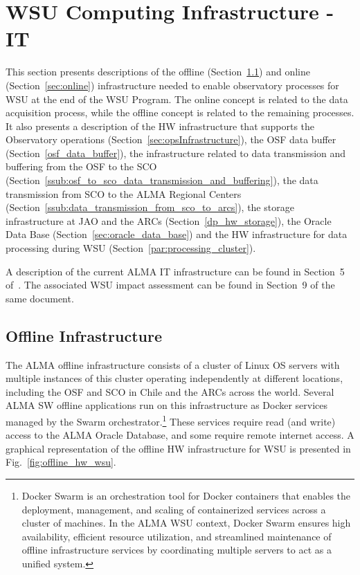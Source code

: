\section{WSU Computing Infrastructure - IT}
\label{sec:wsu_compu_it}

This section presents descriptions of the offline (Section~\ref{sec:offline}) and online (Section~\ref{sec:online}) infrastructure needed to enable observatory processes for WSU at the end of the WSU Program.
The online concept is related to the data acquisition process, while the offline concept is related to the remaining processes. It also presents a description of the HW infrastructure that supports the Observatory operations (Section~\ref{sec:opsInfrastructure}), the OSF data buffer (Section~\ref{osf_data_buffer}), the infrastructure related to data transmission and buffering from the OSF to the \ac{SCO} (Section~\ref{ssub:osf_to_sco_data_transmission_and_buffering}), the data transmission from SCO to the ALMA Regional Centers (Section~\ref{ssub:data_transmission_from_sco_to_arcs}), the storage infrastructure at JAO and the ARCs (Section~\ref{dp_hw_storage}), the Oracle Data Base (Section~\ref{sec:oracle_data_base}) and the HW infrastructure for data processing during WSU (Section~\ref{par:processing_cluster}). 


A description of the current ALMA IT infrastructure can be found in Section~5 of~\cite{CSA-IA}. The associated WSU impact assessment can be found in Section~9 of the same document. 



\subsection{Offline Infrastructure}
\label{sec:offline}
The ALMA offline infrastructure consists of a cluster of Linux OS servers with multiple instances of this cluster operating independently at different locations, including the OSF and SCO in Chile and the ARCs across the world. Several ALMA SW offline applications run on this infrastructure as Docker services managed by the Swarm orchestrator.\footnote{Docker Swarm is an orchestration tool for Docker containers that enables the deployment, management, and scaling of containerized services across a cluster of machines. In the ALMA WSU context, Docker Swarm ensures high availability, efficient resource utilization, and streamlined maintenance of offline infrastructure services by coordinating multiple servers to act as a unified system.} These services require read (and write) access to the ALMA Oracle Database, and some require remote internet access. A graphical representation of the offline HW infrastructure for WSU is presented in Fig.~\ref{fig:offline_hw_wsu}.

